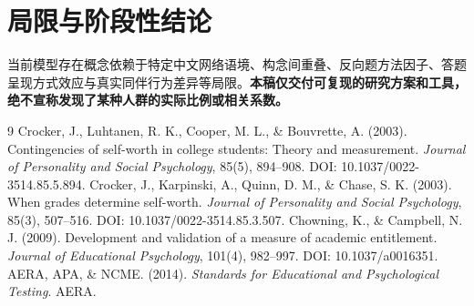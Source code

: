 \documentclass[11pt,a4paper,UTF8,fontset=none]{ctexart}
\begin{document}
\section{局限与阶段性结论}
当前模型存在概念依赖于特定中文网络语境、构念间重叠、反向题方法因子、答题呈现方式效应与真实同伴行为差异等局限。\textbf{本稿仅交付可复现的研究方案和工具，绝不宣称发现了某种人群的实际比例或相关系数。}
\begin{thebibliography}{9}
 Crocker, J., Luhtanen, R. K., Cooper, M. L., \& Bouvrette, A. (2003). Contingencies of self-worth in college students: Theory and measurement. \emph{Journal of Personality and Social Psychology}, 85(5), 894--908. DOI: 10.1037/0022-3514.85.5.894.
 Crocker, J., Karpinski, A., Quinn, D. M., \& Chase, S. K. (2003). When grades determine self-worth. \emph{Journal of Personality and Social Psychology}, 85(3), 507--516. DOI: 10.1037/0022-3514.85.3.507.
 Chowning, K., \& Campbell, N. J. (2009). Development and validation of a measure of academic entitlement. \emph{Journal of Educational Psychology}, 101(4), 982--997. DOI: 10.1037/a0016351.
 AERA, APA, \& NCME. (2014). \emph{Standards for Educational and Psychological Testing}. AERA.
\end{thebibliography}
\appendix
\end{document}

